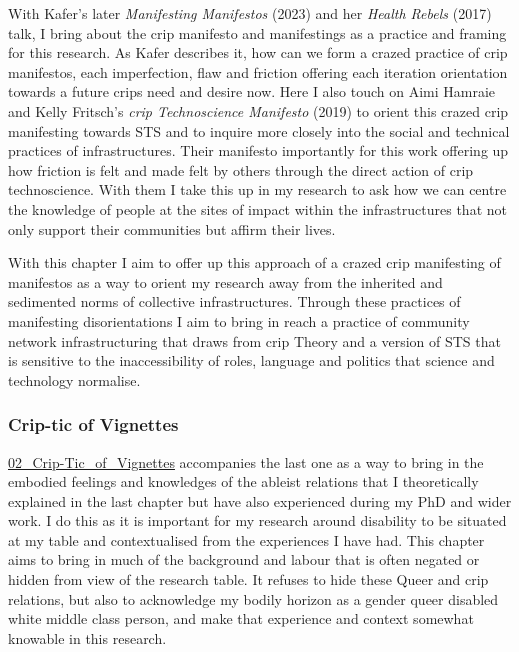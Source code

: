 With Kafer's later \emph{Manifesting Manifestos} (2023) and her
\emph{Health Rebels} (2017) talk, I bring about the crip manifesto and
manifestings as a practice and framing for this research. As Kafer
describes it, how can we form a crazed practice of crip manifestos, each
imperfection, flaw and friction offering each iteration orientation
towards a future crips need and desire now. Here I also touch on Aimi
Hamraie and Kelly Fritsch's \emph{crip Technoscience Manifesto} (2019)
to orient this crazed crip manifesting towards STS and to inquire more
closely into the social and technical practices of infrastructures.
Their manifesto importantly for this work offering up how friction is
felt and made felt by others through the direct action of crip
technoscience. With them I take this up in my research to ask how we can
centre the knowledge of people at the sites of impact within the
infrastructures that not only support their communities but affirm their
lives.

With this chapter I aim to offer up this approach of a crazed crip
manifesting of manifestos as a way to orient my research away from the
inherited and sedimented norms of collective infrastructures. Through
these practices of manifesting disorientations I aim to bring in reach a
practice of community network infrastructuring that draws from crip
Theory and a version of STS that is sensitive to the inaccessibility of
roles, language and politics that science and technology normalise.

\hypertarget{crip-tic-of-vignettes}{%
\subsubsection{Crip-tic of Vignettes}\label{crip-tic-of-vignettes}}

\href{../../02_Crip-Tic_of_Vignettes/02_Crip-Tic_of_Vignettes.md}{02\_Crip-Tic\_of\_Vignettes}
accompanies the last one as a way to bring in the embodied feelings and
knowledges of the ableist relations that I theoretically explained in
the last chapter but have also experienced during my PhD and wider work.
I do this as it is important for my research around disability to be
situated at my table and contextualised from the experiences I have had.
This chapter aims to bring in much of the background and labour that is
often negated or hidden from view of the research table. It refuses to
hide these Queer and crip relations, but also to acknowledge my bodily
horizon as a gender queer disabled white middle class person, and make
that experience and context somewhat knowable in this research.

